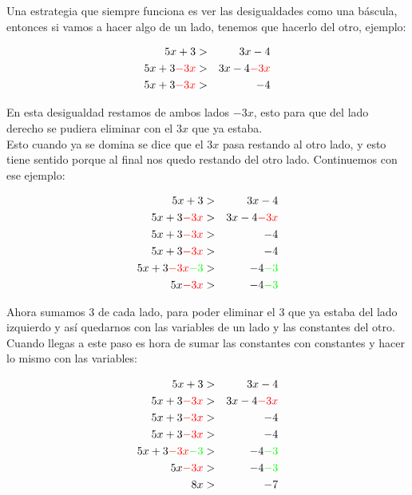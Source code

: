 \documentclass[paper=letter, fontsize=14pt]{scrartcl}
\numberwithin{equation}{section} %
\numberwithin{figure}{section} %
\numberwithin{table}{section} %
\begin{document}
Una estrategia que siempre funciona es ver las desigualdades como una báscula, entonces si vamos a hacer algo de un lado, tenemos que hacerlo del otro, ejemplo:

\begin{eqnarray*}
5x+3&>&3x-4\\
5x+3\textcolor{red}{-3x}&>&3x-4\textcolor{red}{-3x}\\
5x+3\textcolor{red}{-3x}&>&-4\\
\end{eqnarray*}

En esta desigualdad restamos de ambos lados $-3x$, esto para que del lado derecho se pudiera eliminar con el $3x$ que ya estaba.\\

Esto cuando ya se domina se dice que el $3x$ pasa restando al otro lado, y esto tiene sentido porque al final nos quedo restando del otro lado. Continuemos con ese ejemplo:

\begin{eqnarray*}
5x+3&>&3x-4\\
5x+3\textcolor{red}{-3x}&>&3x-4\textcolor{red}{-3x}\\
5x+3\textcolor{red}{-3x}&>&-4\\
5x+3\textcolor{red}{-3x}&>&-4\\
5x+3\textcolor{red}{-3x}\textcolor{green}{-3}&>&-4\textcolor{green}{-3}\\
5x\textcolor{red}{-3x}&>&-4\textcolor{green}{-3}\\
\end{eqnarray*}

Ahora sumamos $3$ de cada lado, para poder eliminar el $3$ que ya estaba del lado izquierdo y así quedarnos con las variables de un lado y las constantes del otro.\\

Cuando llegas a este paso es hora de sumar las constantes con constantes y hacer lo mismo con las variables:

\begin{eqnarray*}
5x+3&>&3x-4\\
5x+3\textcolor{red}{-3x}&>&3x-4\textcolor{red}{-3x}\\
5x+3\textcolor{red}{-3x}&>&-4\\
5x+3\textcolor{red}{-3x}&>&-4\\
5x+3\textcolor{red}{-3x}\textcolor{green}{-3}&>&-4\textcolor{green}{-3}\\
5x\textcolor{red}{-3x}&>&-4\textcolor{green}{-3}\\
8x&>&-7\\
\end{eqnarray*}
\end{document}
